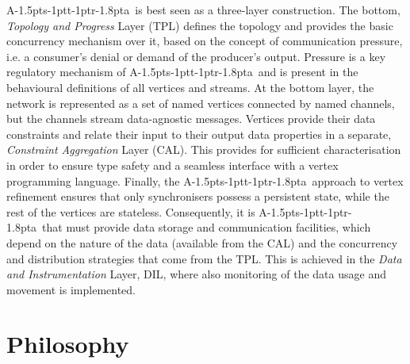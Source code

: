 \documentclass[11pt]{report}
\def\ak{{\textsf{A\kern-1.5pts\kern-1ptt\kern-1ptr\kern-1.8pta}}\kern-2pt{\it K\kern-2ptahn}}
\begin{document}
\ak\ is best seen as a three-layer construction. The bottom, {\em Topology and Progress} Layer (TPL) defines the topology and provides the basic concurrency
mechanism over it, based on the concept of communication pressure, i.e. a consumer's denial or demand of the producer's output.
Pressure is a key regulatory mechanism of \ak\ and is present
in the behavioural definitions of all vertices and streams. At the bottom layer, the network is represented as a set of named
vertices connected by named channels, but the channels stream data-agnostic messages. Vertices provide their data constraints
and relate their input to their output data properties in a separate, {\em Constraint Aggregation} Layer (CAL). This provides
for sufficient characterisation in order to ensure type safety and a seamless interface with a vertex programming language.
Finally, the \ak\ approach to vertex refinement ensures that only synchronisers possess a persistent state, while the rest
of the vertices are stateless. Consequently, it is \ak\ that must provide data storage and communication facilities, which
depend on the nature of the data (available from the CAL) and the concurrency and distribution strategies that come
from the TPL. This is achieved in the {\em Data and Instrumentation} Layer, DIL,
where also monitoring of the data usage and movement is implemented.

\section{Philosophy}
\end{document}
